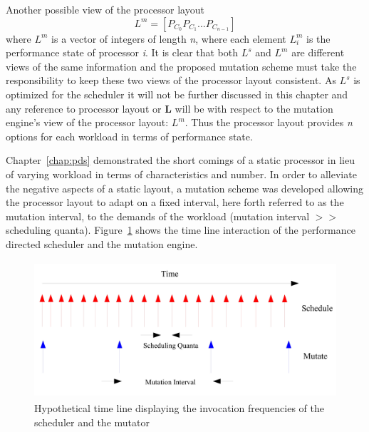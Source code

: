 Another possible view of the processor layout 
\begin{equation}
    L^m = [ P_{C_{0}} P_{C_{1}} ... P_{C_{n-1}} ]
\label{eq:mutator_layout_view}
\end{equation}
where $L^m$ is a vector of integers of length \textit{n}, where each element $L^m_i$ is the
performance state of processor \textit{i}. 
It is clear that both $L^s$ and $L^m$ are different views of the same information and 
the proposed mutation scheme must take the responsibility to keep these two views
of the processor layout consistent. As $L^s$ is optimized for the scheduler it will not
be further discussed in this chapter and any reference to processor layout or \textbf{L} will be
with respect to the mutation engine's view of the processor layout: $L^m$. 
Thus the processor layout provides \textit{n} options for each workload in terms of 
performance state. 

Chapter~\ref{chap:pds} demonstrated the short comings of a static processor in lieu of 
varying workload in terms of characteristics and number. In order to alleviate the 
negative aspects of a static layout, a mutation scheme was developed allowing the 
processor layout to adapt on a fixed interval, here forth referred to as the mutation 
interval, to the demands of the workload (mutation interval $>>$ scheduling quanta).
Figure~\ref{fig:schedule_mutate} shows the time line interaction of the performance 
directed scheduler and the mutation engine. 

\begin{figure}[h!]
  \begin{center}
    \includegraphics[height=2in]{figures/Schedule_Mutate.jpg}
    \caption{Hypothetical time line displaying the invocation frequencies of the scheduler and the mutator}
    \label{fig:schedule_mutate}
  \end{center}
\end{figure}

